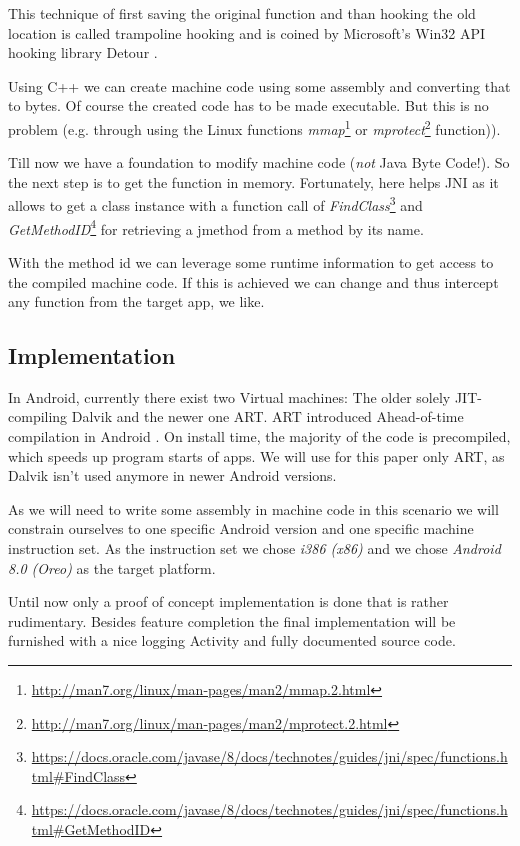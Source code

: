 This technique of first saving the original function and than hooking the old location is called trampoline hooking and is coined by Microsoft's Win32 API hooking library Detour \cite{detours-binary-interception-of-win32-functions}.

Using C++ we can create machine code using some assembly and converting that to bytes.
Of course the created code has to be made executable. But this is no problem (e.g. through using the Linux functions \emph{mmap}\footnote{\url{http://man7.org/linux/man-pages/man2/mmap.2.html}} or \emph{mprotect}\footnote{\url{http://man7.org/linux/man-pages/man2/mprotect.2.html}} function)).

Till now we have a foundation to modify machine code (\emph{not} Java Byte Code!). So the next step is to get the function in memory. Fortunately, here helps JNI as it allows to get a class instance with a function call of  \emph{FindClass}\footnote{\url{https://docs.oracle.com/javase/8/docs/technotes/guides/jni/spec/functions.html\#FindClass}} and \emph{GetMethodID}\footnote{\url{https://docs.oracle.com/javase/8/docs/technotes/guides/jni/spec/functions.html\#GetMethodID}} for retrieving a jmethod from a method by its name.

With the method id we can leverage some runtime information to get access to the compiled machine code. If this is achieved we can change and thus intercept any function from the target app, we like.


\subsection{Implementation}

In Android, currently there exist two Virtual machines: The older solely JIT-compiling Dalvik and the newer one ART. ART introduced Ahead-of-time compilation in Android \cite{ArtAndDalvik}. On install time, the majority of the code is precompiled, which speeds up program starts of apps. We will use for this paper only ART, as Dalvik isn't used anymore in newer Android versions.

As we will need to write some assembly in machine code in this scenario we will 
constrain ourselves to one specific Android version and one specific machine instruction set. As the instruction set we  chose \emph{i386 (x86)} and 
we chose \emph{Android 8.0 (Oreo)} as the target platform.

Until now only a proof of concept implementation is done that is rather rudimentary. 
Besides feature completion the final implementation will be furnished with a nice logging Activity and fully documented source code. 

